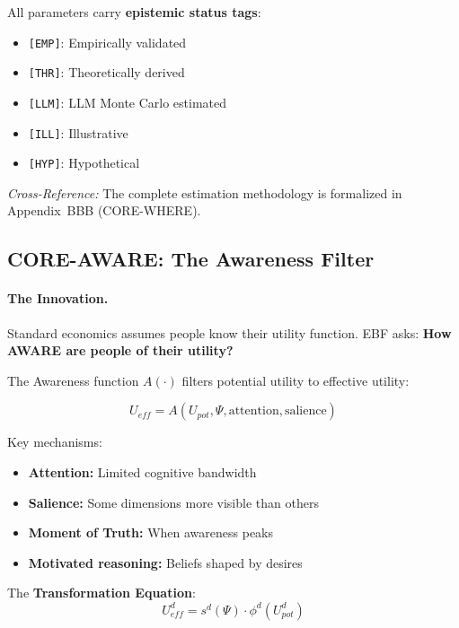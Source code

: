 All parameters carry \textbf{epistemic status tags}:
\begin{itemize}[nosep]
\item \texttt{[EMP]}: Empirically validated
\item \texttt{[THR]}: Theoretically derived
\item \texttt{[LLM]}: LLM Monte Carlo estimated
\item \texttt{[ILL]}: Illustrative
\item \texttt{[HYP]}: Hypothetical
\end{itemize}

\textit{Cross-Reference:} The complete estimation methodology is formalized
in Appendix~BBB (CORE-WHERE).

\subsection{CORE-AWARE: The Awareness Filter}
\label{sec:8c-aware}

\paragraph{The Innovation.}
Standard economics assumes people know their utility function. EBF asks:
\textbf{How AWARE are people of their utility?}

The Awareness function $A(\cdot)$ filters potential utility to effective utility:

\begin{equation}
U_{eff} = A(U_{pot}, \Psi, \text{attention}, \text{salience})
\end{equation}

Key mechanisms:
\begin{itemize}[nosep]
\item \textbf{Attention:} Limited cognitive bandwidth
\item \textbf{Salience:} Some dimensions more visible than others
\item \textbf{Moment of Truth:} When awareness peaks
\item \textbf{Motivated reasoning:} Beliefs shaped by desires
\end{itemize}

The \textbf{Transformation Equation}:
\begin{equation}
U_{eff}^d = s^d(\Psi) \cdot \phi^d(U_{pot}^d)
\end{equation}

